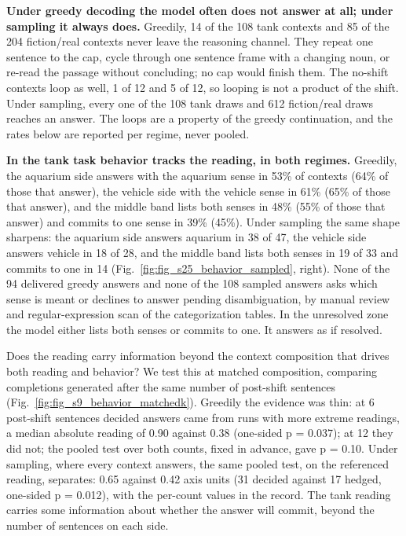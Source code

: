 \documentclass[11pt]{article}
\begin{document}
\textbf{Under greedy decoding the model often does not answer at all; under sampling it
always does.} Greedily, 14 of the 108 tank contexts and 85 of the 204 fiction/real
contexts never leave the reasoning channel. They repeat one sentence to the cap, cycle
through one sentence frame with a changing noun, or re-read the passage without
concluding; no cap would finish them. The no-shift contexts loop as well, 1 of 12 and
5 of 12, so looping is not a product of the shift. Under sampling, every one of the
108 tank draws and 612 fiction/real draws reaches an answer. The loops are a property
of the greedy continuation, and the rates below are reported per regime, never pooled.

\textbf{In the tank task behavior tracks the reading, in both regimes.} Greedily, the aquarium side answers with the aquarium sense in 53\% of contexts (64\% of those that answer), the vehicle side with the vehicle sense in 61\% (65\% of those that answer), and the middle band lists both senses in 48\% (55\% of those that answer) and commits to one sense in 39\% (45\%). Under sampling the same shape
sharpens: the aquarium side answers aquarium in 38 of 47, the vehicle side answers
vehicle in 18 of 28, and the middle band lists both senses in 19 of 33 and commits to
one in 14 (Fig.~\ref{fig:fig_s25_behavior_sampled}, right). None of the 94 delivered greedy
answers and none of the 108 sampled answers asks which sense is meant or declines to
answer pending disambiguation, by manual review and regular-expression scan of the
categorization tables. In the unresolved zone the model either lists both senses or commits
to one. It answers as if resolved.

Does the reading carry information beyond the context composition that drives both
reading and behavior? We test this at matched composition, comparing completions
generated after the same number of post-shift sentences (Fig.~\ref{fig:fig_s9_behavior_matchedk}). Greedily the evidence was thin: at 6 post-shift sentences
decided answers came from runs with more extreme readings, a median absolute reading
of 0.90 against 0.38 (one-sided p = 0.037); at 12 they did not; the pooled test over
both counts, fixed in advance, gave p = 0.10. Under sampling, where every context answers, the same pooled test, on the referenced reading, separates: 0.65 against 0.42 axis units (31 decided
against 17 hedged, one-sided p = 0.012), with the per-count values in the record.
The tank reading carries some information about whether the answer will commit,
beyond the number of sentences on each side.
\end{document}
